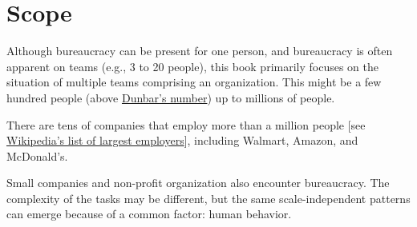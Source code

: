\section{Scope}
Although bureaucracy can be present for one person, and bureaucracy is often apparent on teams (e.g., 3 to 20 people), this book primarily focuses on the situation of multiple teams comprising an organization. This might be a few hundred people (above \href{https://en.wikipedia.org/wiki/Dunbar's_number}{Dunbar's number}) up to millions of people. 

There are tens of companies that employ more than a million people [see \href{https://en.wikipedia.org/wiki/List_of_largest_employers}{Wikipedia's list of largest employers}], including Walmart, Amazon, and McDonald's.

Small companies and non-profit organization also encounter bureaucracy. The complexity of the tasks may be different, but the same scale-independent patterns can emerge because of a common factor: human behavior.